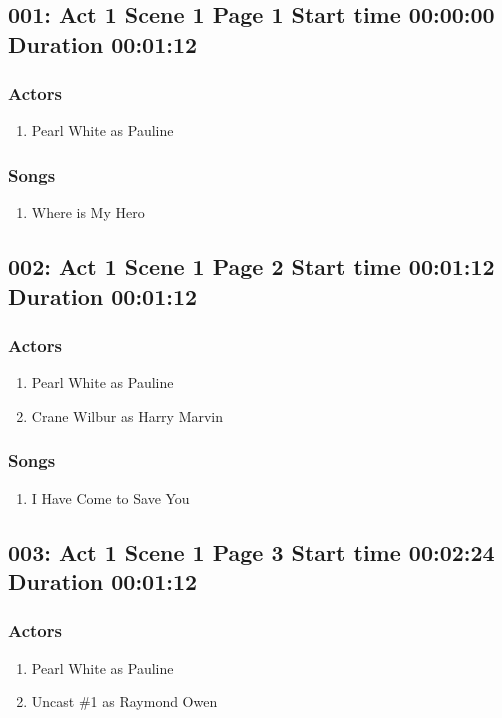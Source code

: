 \subsection{001: Act 1 Scene 1 Page 1 Start time 00:00:00 Duration 00:01:12}

\subsubsection{Actors}
\begin{enumerate}
\item Pearl White as Pauline
\end{enumerate}

\subsubsection{Songs}
\begin{enumerate}
\item Where is My Hero
\end{enumerate}
\subsection{002: Act 1 Scene 1 Page 2 Start time 00:01:12 Duration 00:01:12}

\subsubsection{Actors}
\begin{enumerate}
\item Pearl White as Pauline
\item Crane Wilbur as Harry Marvin
\end{enumerate}

\subsubsection{Songs}
\begin{enumerate}
\item I Have Come to Save You
\end{enumerate}
\subsection{003: Act 1 Scene 1 Page 3 Start time 00:02:24 Duration 00:01:12}

\subsubsection{Actors}
\begin{enumerate}
\item Pearl White as Pauline
\item Uncast \#1 as Raymond Owen
\end{enumerate}

